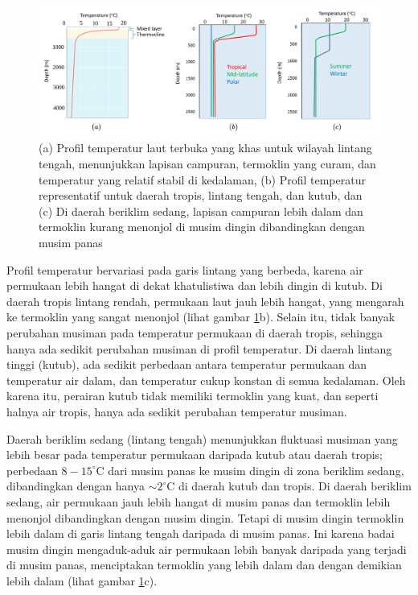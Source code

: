 \begin{spacing}{1.5}
	\begin{figure}[H]
		\centering
		\includegraphics[width=15cm]{contents/mld_theory}
		\caption{(a) Profil temperatur laut terbuka yang khas untuk wilayah lintang tengah, menunjukkan lapisan campuran, termoklin yang curam, dan temperatur yang relatif stabil di kedalaman, (b) Profil temperatur representatif untuk daerah tropis, lintang tengah, dan kutub, dan (c) Di daerah beriklim sedang, lapisan campuran lebih dalam dan termoklin kurang menonjol di musim dingin dibandingkan dengan musim panas  \protect{}}
		\label{fig:mld_theory}
	\end{figure}
	 Profil temperatur bervariasi pada garis lintang yang berbeda, karena air permukaan lebih hangat di dekat khatulistiwa dan lebih dingin di kutub. Di daerah tropis lintang rendah, permukaan laut jauh lebih hangat, yang mengarah ke termoklin yang sangat menonjol (lihat gambar \ref{fig:mld_theory}b). Selain itu, tidak banyak perubahan musiman pada temperatur permukaan di daerah tropis, sehingga hanya ada sedikit perubahan musiman di profil temperatur. Di daerah lintang tinggi (kutub), ada sedikit perbedaan antara temperatur permukaan dan temperatur air dalam, dan temperatur cukup konstan di semua  kedalaman. Oleh karena itu, perairan kutub tidak memiliki termoklin yang kuat, dan seperti halnya air tropis, hanya ada sedikit perubahan temperatur musiman. 
	 
	 Daerah beriklim sedang (lintang tengah) menunjukkan fluktuasi musiman yang lebih besar pada temperatur permukaan daripada kutub atau daerah tropis; perbedaan $8-15^\circ$C dari musim panas ke musim dingin di zona beriklim sedang, dibandingkan dengan hanya $\sim 2^\circ$C di daerah kutub dan tropis. Di daerah beriklim sedang, air permukaan jauh lebih hangat di musim panas dan termoklin lebih menonjol dibandingkan dengan musim dingin. Tetapi di musim dingin termoklin lebih dalam di garis lintang tengah daripada di musim panas. Ini karena badai musim dingin mengaduk-aduk air permukaan lebih banyak daripada yang terjadi di musim panas, menciptakan termoklin yang lebih dalam dan dengan demikian lebih dalam (lihat gambar \ref{fig:mld_theory}c).
\end{spacing}
\vspace{-0.1pc}
%
